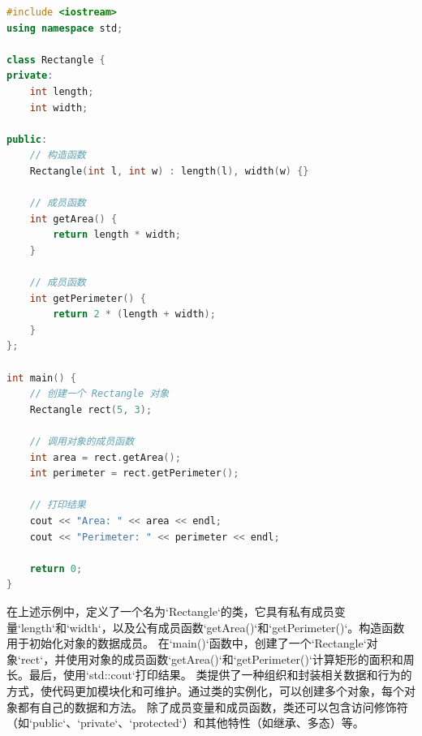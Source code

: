 \documentclass[12pt,twiside,a4paper]{ctexbook}
\numberwithin{chapter}{part}
\begin{document}
\begin{lstlisting}[language=C++]
#include <iostream>
using namespace std;

class Rectangle {
private:
    int length;
    int width;

public:
    // 构造函数
    Rectangle(int l, int w) : length(l), width(w) {}

    // 成员函数
    int getArea() {
        return length * width;
    }

    // 成员函数
    int getPerimeter() {
        return 2 * (length + width);
    }
};

int main() {
    // 创建一个 Rectangle 对象
    Rectangle rect(5, 3);

    // 调用对象的成员函数
    int area = rect.getArea();
    int perimeter = rect.getPerimeter();

    // 打印结果
    cout << "Area: " << area << endl;
    cout << "Perimeter: " << perimeter << endl;

    return 0;
}
\end{lstlisting}
在上述示例中，定义了一个名为`Rectangle`的类，它具有私有成员变量`length`和`width`，以及公有成员函数`getArea()`和`getPerimeter()`。构造函数用于初始化对象的数据成员。
在`main()`函数中，创建了一个`Rectangle`对象`rect`，并使用对象的成员函数`getArea()`和`getPerimeter()`计算矩形的面积和周长。最后，使用`std::cout`打印结果。
类提供了一种组织和封装相关数据和行为的方式，使代码更加模块化和可维护。通过类的实例化，可以创建多个对象，每个对象都有自己的数据和方法。
除了成员变量和成员函数，类还可以包含访问修饰符（如`public`、`private`、`protected`）和其他特性（如继承、多态）等。
\end{document}

